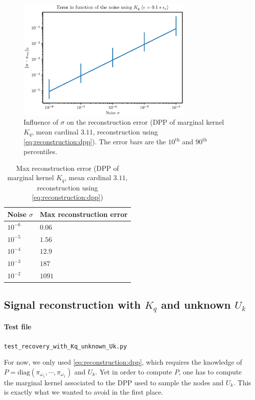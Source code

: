\documentclass{article}
\begin{document}
\begin{figure}[ht]
\centering
\includegraphics[height=6cm]{error_function_noise_Kq.eps}
\caption{Influence of $\sigma$ on the reconstruction error (DPP of marginal kernel $K_q$, mean cardinal $3.11$, reconstruction using \eqref{eq:reconstruction:dpp}). The error bars are the $10^\text{th}$ and $90^\text{th}$ percentiles.} \label{fig:Kq:recerror}
\end{figure}


\begin{table}[ht]
  \caption{Max reconstruction error (DPP of marginal kernel $K_q$, mean cardinal $3.11$, reconstruction using \eqref{eq:reconstruction:dpp})}
  \label{tab:Kq:maxrecerror}
  \centering
  \begin{tabular}{ll}
    \toprule
    Noise $\sigma$ &  Max reconstruction error \\
    \midrule
    $10^{-6}$ & $0.06$ \\
    $10^{-5}$ & $1.56$ \\
    $10^{-4}$ & $12.9$ \\
		$10^{-3}$ & $187$ \\
		$10^{-2}$ & $1091$ \\
    \bottomrule
  \end{tabular}
\end{table}


\subsection[Signal reconstruction with Kq and unknown Uk]{Signal reconstruction with $K_q$ and unknown $U_k$}


\paragraph{Test file} \verb#test_recovery_with_Kq_unknown_Uk.py#


For now, we only used \eqref{eq:reconstruction:dpp}, which requires the knowledge of $P = \mathrm{diag} (\pi_{\omega_1}, \cdots, \pi_{\omega_1})$ and $U_k$. Yet in order to compute $P$, one has to compute the marginal kernel associated to the DPP used to sample the nodes and $U_k$. This is exactly what we wanted to avoid in the first place.
\end{document}
